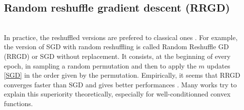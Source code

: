 \documentclass[article,authoryear,jmlmc]{beg_32}             %
\begin{document}
\subsection{Random reshuffle gradient descent (RRGD)}
~~\\
In practice, the reshuffled versions are prefered to classical ones \cite{RR_use1,RR_use2,RG_mean}. For example, the version of SGD with random reshuffling is called Random Reshuffle GD (RRGD) or SGD without replacement. It consists, at the beginning of every epoch, in sampling a random permutation and then to apply the $m$ updates \eqref{SGD} in the order given by the permutation. Empirically, it seems that RRGD converges faster than SGD and gives better performances \cite{RR_use1,RR_use_superior}. Many works \cite{RR_outperforms_quadratics,RR_use3,RR_outperforms_convex,RR_small_epochs} try to explain this superiority theoretically, especially for well-conditionned convex functions.
\end{document}
